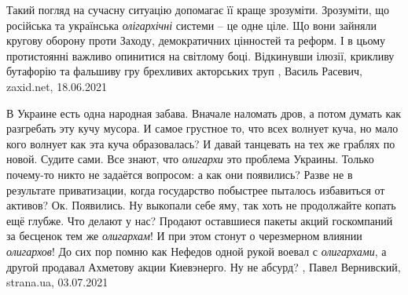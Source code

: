 Такий погляд на сучасну ситуацію допомагає її краще зрозуміти. Зрозуміти, що
російська та українська \emph{олігархічні} системи – це одне ціле. Що вони зайняли
кругову оборону проти Заходу, демократичних цінностей та реформ. І в цьому
протистоянні важливо опинитися на світлому боці. Відкинувши ілюзії, крикливу
бутафорію та фальшиву гру брехливих акторських труп
, 
Василь Расевич, zaxid.net, 18.06.2021

В Украине есть одна народная забава. Вначале наломать дров, а потом думать как
разгребать эту кучу мусора. И самое грустное то, что всех волнует куча, но мало
кого волнует как эта куча образовалась? И давай танцевать на тех же граблях по
новой.  Судите сами. Все знают, что \emph{олигархи} это проблема Украины. Только
почему-то никто не задаётся вопросом: а как они появились? Разве не в
результате приватизации, когда государство побыстрее пыталось избавиться от
активов?  Ок. Появились. Ну выкопали себе яму, так хоть не продолжайте копать
ещё глубже.  Что делают у нас? Продают оставшиеся пакеты акций госкомпаний за
бесценок тем же \emph{олигархам}! И при этом стонут о черезмерном влиянии \emph{олигархов}!
До сих пор помню как Нефедов одной рукой воевал с \emph{олигархами}, а другой продавал
Ахметову акции Киевэнерго. Ну не абсурд?
, 
Павел Вернивский, strana.ua, 03.07.2021
